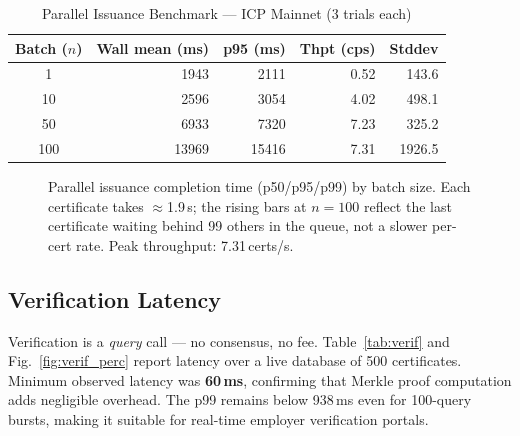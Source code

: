 \documentclass[conference]{IEEEtran}
\begin{document}
\begin{table}[t]
\caption{Parallel Issuance Benchmark --- ICP Mainnet (3 trials each)}
\label{tab:issuance}
\centering\small\renewcommand{\arraystretch}{1.1}
\begin{tabular}{@{}crrrr@{}}
\toprule
\textbf{Batch ($n$)} & \textbf{Wall mean (ms)} & \textbf{p95 (ms)} & \textbf{Thpt (cps)} & \textbf{Stddev} \\
\midrule
1   & 1943  & 2111  & 0.52 & 143.6 \\
10  & 2596  & 3054  & 4.02 & 498.1 \\
50  & 6933  & 7320  & 7.23 & 325.2 \\
100 & 13969 & 15416 & 7.31 & 1926.5 \\
\bottomrule
\end{tabular}
\end{table}

\begin{figure}[t]
\centering
{}
\caption{Parallel issuance completion time (p50/p95/p99) by batch size. Each certificate takes $\approx$1.9\,s; the rising bars at $n{=}100$ reflect the last certificate waiting behind 99 others in the queue, not a slower per-cert rate. Peak throughput: 7.31\,certs/s.}
\label{fig:issuance_perc}
\end{figure}

\subsection{Verification Latency}
Verification is a \textit{query} call — no consensus, no fee. Table~\ref{tab:verif} and Fig.~\ref{fig:verif_perc} report latency over a live database of 500 certificates. Minimum observed latency was \textbf{60\,ms}, confirming that Merkle proof computation adds negligible overhead. The p99 remains below 938\,ms even for 100-query bursts, making it suitable for real-time employer verification portals.
\end{document}
